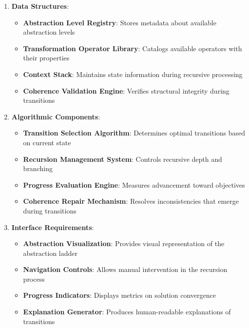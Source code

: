 \documentclass[
]{article}
\providecommand{\tightlist}{%
  \setlength{\itemsep}{0pt}\setlength{\parskip}{0pt}}
\begin{document}
\begin{enumerate}
\def\labelenumi{\arabic{enumi}.}
\tightlist
\item
  \textbf{Data Structures}:

  \begin{itemize}
  \tightlist
  \item
    \textbf{Abstraction Level Registry}: Stores metadata about available
    abstraction levels
  \item
    \textbf{Transformation Operator Library}: Catalogs available
    operators with their properties
  \item
    \textbf{Context Stack}: Maintains state information during recursive
    processing
  \item
    \textbf{Coherence Validation Engine}: Verifies structural integrity
    during transitions
  \end{itemize}
\item
  \textbf{Algorithmic Components}:

  \begin{itemize}
  \tightlist
  \item
    \textbf{Transition Selection Algorithm}: Determines optimal
    transitions based on current state
  \item
    \textbf{Recursion Management System}: Controls recursive depth and
    branching
  \item
    \textbf{Progress Evaluation Engine}: Measures advancement toward
    objectives
  \item
    \textbf{Coherence Repair Mechanism}: Resolves inconsistencies that
    emerge during transitions
  \end{itemize}
\item
  \textbf{Interface Requirements}:

  \begin{itemize}
  \tightlist
  \item
    \textbf{Abstraction Visualization}: Provides visual representation
    of the abstraction ladder
  \item
    \textbf{Navigation Controls}: Allows manual intervention in the
    recursion process
  \item
    \textbf{Progress Indicators}: Displays metrics on solution
    convergence
  \item
    \textbf{Explanation Generator}: Produces human-readable explanations
    of transitions
  \end{itemize}
\end{enumerate}
\end{document}
